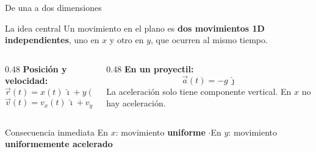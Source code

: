 \documentclass[aspectratio=169,xcolor=dvipsnames]{beamer}
\begin{document}
	\begin{frame}{De una a dos dimensiones}
		\begin{block}{La idea central}
			\centering
			Un movimiento en el plano es \textbf{dos movimientos 1D independientes}, uno en $x$ y otro en $y$,
			que ocurren al mismo tiempo.
		\end{block}
		
		\vspace{0.3cm}
		\begin{columns}[T]
			\begin{column}{0.48\textwidth}
				\textbf{Posición y velocidad:}
				\[
				\vec{r}(t) = x(t)\,\hat{\imath} + y(t)\,\hat{\jmath}
				\]
				\[
				\vec{v}(t) = v_x(t)\,\hat{\imath} + v_y(t)\,\hat{\jmath}
				\]
			\end{column}
			\begin{column}{0.48\textwidth}
				\textbf{En un proyectil:}
				\[
				\vec{a}(t) = -g\,\hat{\jmath}
				\]
				\small La aceleración solo tiene componente vertical.
				En $x$ no hay aceleración.
			\end{column}
		\end{columns}
		
		\vspace{0.35cm}
		\begin{exampleblock}{Consecuencia inmediata}
			\centering
			En $x$: movimiento \textbf{uniforme} \qquad$\cdot$\qquad En $y$: movimiento \textbf{uniformemente acelerado}
		\end{exampleblock}
	\end{frame}
	
\end{document}
